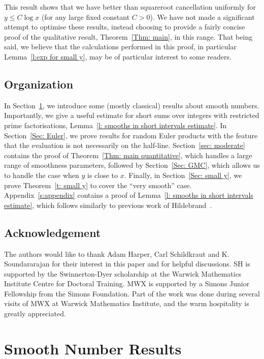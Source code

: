 \documentclass[12pt,a4paper,reqno]{amsart}
\numberwithin{equation}{section}
\def\leq {\leqslant}
\theoremstyle{remark}
\theoremstyle{definition}
\numberwithin{equation}{section}
\theoremstyle{remark}
\begin{document}
This result shows that we have better than squareroot cancellation uniformly for $y \leq C \log x$ (for any large fixed constant $C>0$). We have not made a significant attempt to optimise these results, instead choosing to provide a fairly concise proof of the qualitative result, Theorem~\ref{Thm: main}, in this range. That being said, we believe that the calculations performed in this proof, in particular Lemma~\ref{l:exp for small y}, may be of particular interest to some readers.

\subsection{Organization} 
In Section~\ref{Sec: smooth}, we introduce some (mostly classical) results about smooth numbers. Importantly, we give a useful estimate for short sums over integers with restricted prime factorisations, Lemma~\ref{l: smooths in short intervals estimate}. In Section~\ref{Sec: Euler}, we prove results for random Euler products with the feature that the evaluation is not necessarily on the half-line. Section~\ref{sec: moderate} contains the proof of Theorem~\ref{Thm: main quantitative}, which handles a large range of smoothness parameters, followed by Section~\ref{Sec: GMC}, which allows us to handle the case when $y$ is close to $x$. Finally, in Section~\ref{Sec: small y}, we prove Theorem~\ref{t: small y} to cover the ``very smooth'' case. Appendix~\ref{s:appendix} contains a proof of Lemma~\ref{l: smooths in short intervals estimate}, which follows similarly to previous work of Hildebrand~\cite{Hildebrand}.

\subsection*{Acknowledgement}
The authors would like to thank Adam Harper, Carl Schildkraut and K. Soundararajan for their interest in this paper and for helpful discussions. SH is supported by the Swinnerton-Dyer scholarship at the Warwick Mathematics Institute Centre for Doctoral Training.
MWX is supported by a Simons Junior Fellowship from the Simons Foundation. Part of the work was done during several visits of MWX at Warwick Mathematics Institute, and the warm hospitality is greatly appreciated. 

\section{Smooth Number Results}\label{Sec: smooth}
\end{document}
